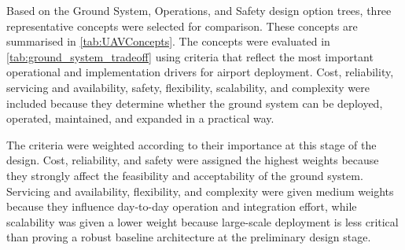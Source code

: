 
Based on the Ground System, Operations, and Safety design option trees, three representative concepts were selected for comparison. These concepts are summarised in \autoref{tab:UAVConcepts}. The concepts were evaluated in \autoref{tab:ground_system_tradeoff} using criteria that reflect the most important operational and implementation drivers for airport deployment. Cost, reliability, servicing and availability, safety, flexibility, scalability, and complexity were included because they determine whether the ground system can be deployed, operated, maintained, and expanded in a practical way.

The criteria were weighted according to their importance at this stage of the design. Cost, reliability, and safety were assigned the highest weights because they strongly affect the feasibility and acceptability of the ground system. Servicing and availability, flexibility, and complexity were given medium weights because they influence day-to-day operation and integration effort, while scalability was given a lower weight because large-scale deployment is less critical than proving a robust baseline architecture at the preliminary design stage.





